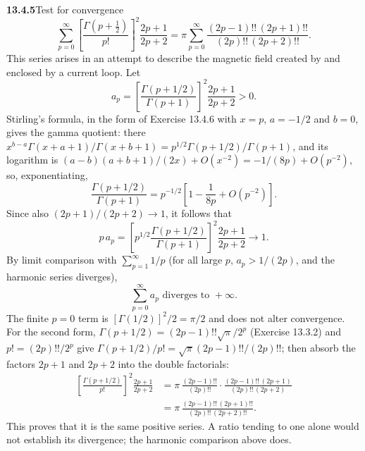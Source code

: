 \par\bigskip
\noindent\textbf{13.4.5}\quad Test for convergence
\[
\sum_{p=0}^{\infty}\left[\frac{\Gamma(p+\frac{1}{2})}{p!}\right]^{2}
\frac{2p+1}{2p+2}
=\pi\sum_{p=0}^{\infty}\frac{(2p-1)!!\,(2p+1)!!}{(2p)!!\,(2p+2)!!}.
\]
This series arises in an attempt to describe the magnetic field created by
and enclosed by a current loop.
\solution
Let
\[
a_p=\left[\frac{\Gamma(p+1/2)}{\Gamma(p+1)}\right]^2
\frac{2p+1}{2p+2}>0.
\]
Stirling's formula, in the form of Exercise 13.4.6 with $x=p$,
$a=-1/2$ and $b=0$, gives the gamma quotient: there
$x^{b-a}\Gamma(x+a+1)/\Gamma(x+b+1)=p^{1/2}\Gamma(p+1/2)/\Gamma(p+1)$,
and its logarithm is $(a-b)(a+b+1)/(2x)+O(x^{-2})
=-1/(8p)+O(p^{-2})$, so, exponentiating,
\[
\frac{\Gamma(p+1/2)}{\Gamma(p+1)}
=p^{-1/2}\left[1-\frac1{8p}+O(p^{-2})\right].
\]
Since also $(2p+1)/(2p+2)\to1$, it follows that
\[
p\,a_p=\left[p^{1/2}\frac{\Gamma(p+1/2)}{\Gamma(p+1)}\right]^2
\frac{2p+1}{2p+2}\longrightarrow1.
\]
By limit comparison with $\sum_{p=1}^\infty1/p$ (for all large $p$,
$a_p>1/(2p)$, and the harmonic series diverges),
\[
\boxed{\sum_{p=0}^{\infty}a_p\text{ diverges to }+\infty}.
\]
The finite $p=0$ term is $[\Gamma(1/2)]^2/2=\pi/2$ and does not
alter convergence.
For the second form, $\Gamma(p+1/2)=(2p-1)!!\sqrt\pi/2^p$
(Exercise 13.3.2) and $p!=(2p)!!/2^p$ give
$\Gamma(p+1/2)/p!=\sqrt\pi(2p-1)!!/(2p)!!$; then absorb the factors
$2p+1$ and $2p+2$ into the double factorials:
\begin{align*}
\left[\frac{\Gamma(p+1/2)}{p!}\right]^2\frac{2p+1}{2p+2}
&=\pi\,\frac{(2p-1)!!}{(2p)!!}\cdot
\frac{(2p-1)!!\,(2p+1)}{(2p)!!\,(2p+2)}\\
&=\pi\,\frac{(2p-1)!!\,(2p+1)!!}{(2p)!!\,(2p+2)!!}.
\end{align*}
This proves that it is the same positive series.  A ratio tending
to one alone would not establish its divergence; the harmonic
comparison above does.


